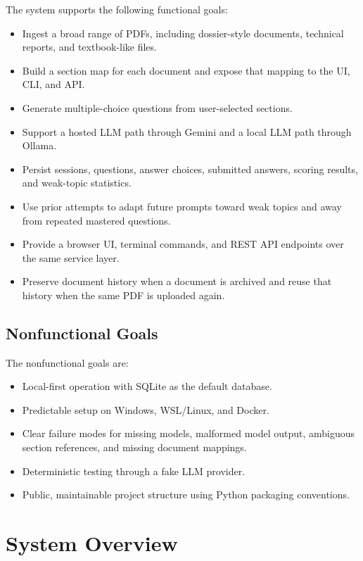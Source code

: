\documentclass[11pt]{article}
\begin{document}
The system supports the following functional goals:

\begin{itemize}
  \item Ingest a broad range of PDFs, including dossier-style documents, technical reports, and textbook-like files.
  \item Build a section map for each document and expose that mapping to the UI, CLI, and API.
  \item Generate multiple-choice questions from user-selected sections.
  \item Support a hosted LLM path through Gemini and a local LLM path through Ollama.
  \item Persist sessions, questions, answer choices, submitted answers, scoring results, and weak-topic statistics.
  \item Use prior attempts to adapt future prompts toward weak topics and away from repeated mastered questions.
  \item Provide a browser UI, terminal commands, and REST API endpoints over the same service layer.
  \item Preserve document history when a document is archived and reuse that history when the same PDF is uploaded again.
\end{itemize}

\subsection{Nonfunctional Goals}

The nonfunctional goals are:

\begin{itemize}
  \item Local-first operation with SQLite as the default database.
  \item Predictable setup on Windows, WSL/Linux, and Docker.
  \item Clear failure modes for missing models, malformed model output, ambiguous section references, and missing document mappings.
  \item Deterministic testing through a fake LLM provider.
  \item Public, maintainable project structure using Python packaging conventions.
\end{itemize}

\section{System Overview}
\end{document}
